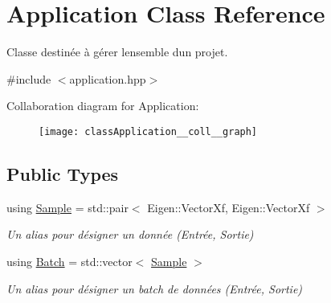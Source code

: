 \hypertarget{classApplication}{}\section{Application Class Reference}
\label{classApplication}


Classe destinée à gérer l\textquotesingle{}ensemble d\textquotesingle{}un projet.  




{\ttfamily \#include $<$application.\+hpp$>$}



Collaboration diagram for Application\+:
\nopagebreak
\begin{figure}[H]
\begin{center}
\leavevmode
\texttt{[image: classApplication\_\_coll\_\_graph]}
\end{center}
\end{figure}
\subsection*{Public Types}
\begin{DoxyCompactItemize}
\item 
using \hyperlink{classApplication_add64c430fa6318ac4885ea5ddedf0780}{Sample} = std\+::pair$<$ Eigen\+::\+Vector\+Xf, Eigen\+::\+Vector\+Xf $>$
\begin{DoxyCompactList}\small\item\em Un alias pour désigner un donnée (Entrée, Sortie) \end{DoxyCompactList}\item 
using \hyperlink{classApplication_a9888f02149ca3b8ffa499ee07426cd1d}{Batch} = std\+::vector$<$ \hyperlink{classApplication_add64c430fa6318ac4885ea5ddedf0780}{Sample} $>$
\begin{DoxyCompactList}\small\item\em Un alias pour désigner un batch de données (Entrée, Sortie) \end{DoxyCompactList}\end{DoxyCompactItemize}
